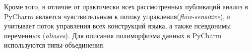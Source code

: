 Кроме того, в отличие от практически всех рассмотренных публикаций анализ в
PyCharm является чувствительным к потоку управления(\emph{flow-sensitive}), и 
учитывает поток управления всех конструкций языка, а также псевдонимы
переменных (\emph{aliases}). Для описания полиморфизма данных в PyCharm
используются типы-объединения. 


